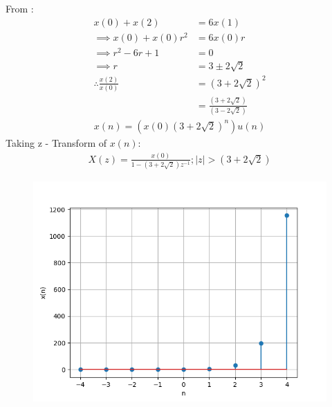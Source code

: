 \documentclass[journal,12pt,twocolumn]{IEEEtran}
\theoremstyle{remark}
\begin{document}
From :
\begin{align}
x(0) + x(2) &= 6x(1) \\
\implies x(0) + x(0)r^2 &= 6x(0)r \\
\implies r^2 - 6r +1 &= 0 \\
\implies r &= 3\pm 2\sqrt{2}\\
    \therefore \frac{x(2)}{x(0)} &= (3 + 2\sqrt{2})^2 \\
    &=  \frac{(3+2\sqrt{2})}{(3-2\sqrt{2})}
\end{align}
\begin{align}
x(n) = (x(0)(3 + 2\sqrt{2})^n)u(n)
\end{align}
Taking z - Transform of $x(n)$:
\begin{align}
    X(z) = \frac{x(0)}{1 - (3 + 2\sqrt{2})z^{-1}} ; |z| > (3 + 2\sqrt{2})
\end{align}
\begin{figure}[ht]
    \centering
    \includegraphics[width = \columnwidth]{ncert-maths/11/9/3/28/figs/x_n_stem_plot.png}
    \caption{}
    \label{fig:graph1.11.9.3.28}
\end{figure}


\end{document}
